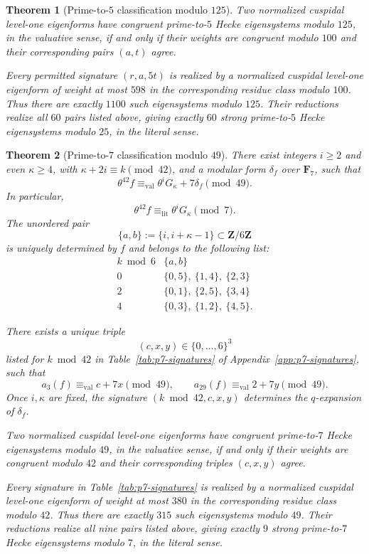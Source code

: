 \documentclass[11pt]{article}
\theoremstyle{plain}
\newtheorem{theorem}{Theorem}[section]
\theoremstyle{definition}
\theoremstyle{remark}
\numberwithin{equation}{section}
\begin{document}
\begin{theorem}[Prime-to-\(5\) classification modulo \(125\)]
Two normalized cuspidal level-one eigenforms have congruent prime-to-\(5\) Hecke eigensystems modulo \(125\), in the valuative sense, if and only if their weights are congruent modulo \(100\) and their corresponding pairs \((a,t)\) agree. 

Every permitted signature \((r,a,5t)\) is realized by a normalized cuspidal level-one eigenform of weight at most \(598\) in the corresponding residue class modulo \(100\). Thus there are exactly \(1100\) such eigensystems modulo \(125\). Their reductions realize all \(60\) pairs listed above, giving exactly \(60\) strong prime-to-\(5\) Hecke eigensystems modulo \(25\), in the literal sense.
\end{theorem}


\begin{theorem}[Prime-to-\(7\) classification modulo \(49\)] \label{thm:intro-p7} There exist integers \(i\geq2\) and even \(\kappa\geq4\), with \(\kappa+2i\equiv k\pmod{42}\), and a modular form \(\delta_f\) over \(\mathbf F_7\), such that \[ \theta^{42}f \equiv_{\mathrm{val}} \theta^iG_\kappa+7\delta_f\pmod{49}. \] In particular, \[ \theta^{42}f\equiv_{\mathrm{lit}}\theta^iG_\kappa\pmod7. \] The unordered pair \[ \{a,b\}:=\{i,i+\kappa-1\}\subset\mathbf Z/6\mathbf Z \] is uniquely determined by \(f\) and belongs to the following list: 
\[
\begin{array}{c|l}
k\bmod6 & \{a,b\}\\ \hline
0 & \{0,5\},\ \{1,4\},\ \{2,3\}\\
2 & \{0,1\},\ \{2,5\},\ \{3,4\}\\
4 & \{0,3\},\ \{1,2\},\ \{4,5\}.
\end{array}
\]

There exists a unique triple \[ (c,x,y)\in\{0,\ldots,6\}^3 \] listed for \(k\bmod42\) in Table~\ref{tab:p7-signatures} of Appendix~\ref{app:p7-signatures}, such that \[ a_3(f)\equiv_{\mathrm{val}}c+7x\pmod{49}, \qquad a_{29}(f)\equiv_{\mathrm{val}}2+7y\pmod{49}. \] Once \(i,\kappa\) are fixed, the signature \((k\bmod42,c,x,y)\) determines the \(q\)-expansion of \(\delta_f\).

Two normalized cuspidal level-one eigenforms have congruent prime-to-\(7\) Hecke eigensystems modulo \(49\), in the valuative sense, if and only if their weights are congruent modulo \(42\) and their corresponding triples \((c,x,y)\) agree. 

Every signature in Table~\ref{tab:p7-signatures} is realized by a normalized cuspidal level-one eigenform of weight at most \(380\) in the corresponding residue class modulo \(42\). Thus there are exactly \(315\) such eigensystems modulo \(49\). Their reductions realize all nine pairs listed above, giving exactly \(9\) strong prime-to-\(7\) Hecke eigensystems modulo \(7\), in the literal sense.
\end{theorem}
\end{document}
